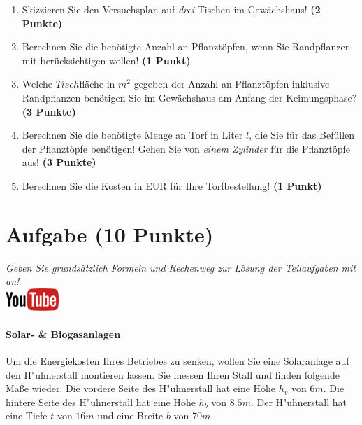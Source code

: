 \documentclass[a4paper, 9pt]{scrartcl}\usepackage[]{graphicx}\usepackage[]{xcolor}
\begin{document}
\begin{enumerate}
\item Skizzieren Sie den Versuchsplan auf \textit{drei} Tischen im
  Gew{\"a}chshaus! \textbf{(2 Punkte)}
\item Berechnen Sie die ben{\"o}tigte Anzahl an Pflanzt{\"o}pfen, wenn Sie
  Randpflanzen mit ber{\"u}cksichtigen wollen! \textbf{(1 Punkt)}
\item Welche $Tisch$fl{\"a}che in $m^2$ gegeben der Anzahl an
  Pflanzt{\"o}pfen inklusive Randpflanzen ben{\"o}tigen Sie im Gew{\"a}chshaus am
  Anfang der Keimungsphase?  \textbf{(3 Punkte)}
\item Berechnen Sie die ben{\"o}tigte Menge an Torf in Liter $l$, die Sie f{\"u}r
  das Bef{\"u}llen der Pflanzt{\"o}pfe ben{\"o}tigen! Gehen Sie von \textit{einem
    Zylinder} f{\"u}r die Pflanzt{\"o}pfe aus!  \textbf{(3 Punkte)}
\item Berechnen Sie die Kosten in EUR f{\"u}r Ihre Torfbestellung! \textbf{(1
    Punkt)}
\end{enumerate}



 
\clearpage

\section{Aufgabe \hfill (10 Punkte)}

\textit{Geben Sie grunds{\"a}tzlich Formeln und Rechenweg zur L{\"o}sung der
  Teilaufgaben mit an!} \\[1Ex]

\hfill\href{https://youtu.be/aBxLkdF-c4M}{\includegraphics[width =
  2cm]{img/youtube}} %
\hspace{2Ex}

\paragraph{Solar- \& Biogasanlagen}



Um die Energiekosten Ihres Betriebes zu senken, wollen Sie eine Solaranlage
auf den H{"u}hnerstall montieren lassen. Sie messen Ihren Stall und finden
folgende Ma{\ss}e wieder. Die vordere Seite des H{"u}hnerstall hat eine H{\"o}he
$h_v$ von $6m$. Die hintere Seite des H{"u}hnerstall hat eine
H{\"o}he $h_b$ von $8.5m$. Der H{"u}hnerstall hat eine Tiefe $t$ von
$16m$ und eine Breite $b$ von $70m$.
\end{document}
